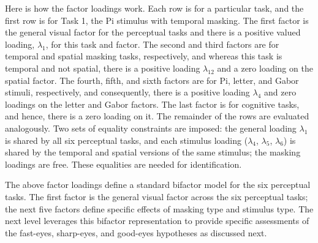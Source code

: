 \documentclass[
  ,man]{apa6}
\begin{document}
Here is how the factor loadings work. Each row is for a particular task, and the first row is for Task 1, the Pi stimulus with temporal masking. The first factor is the general visual factor for the perceptual tasks and there is a positive valued loading, \(\lambda_{1}\), for this task and factor. The second and third factors are for temporal and spatial masking tasks, respectively, and whereas this task is temporal and not spatial, there is a positive loading \(\lambda_{12}\) and a zero loading on the spatial factor. The fourth, fifth, and sixth factors are for Pi, letter, and Gabor stimuli, respectively, and consequently, there is a positive loading \(\lambda_{4}\) and zero loadings on the letter and Gabor factors. The last factor is for cognitive tasks, and hence, there is a zero loading on it. The remainder of the rows are evaluated analogously. Two sets of equality constraints are imposed: the general loading \(\lambda_1\) is shared by all six perceptual tasks, and each stimulus loading (\(\lambda_4\), \(\lambda_5\), \(\lambda_6\)) is shared by the temporal and spatial versions of the same stimulus; the masking loadings are free. These equalities are needed for identification.

The above factor loadings define a standard bifactor model for the six perceptual
tasks. The first factor is the general visual factor across the six perceptual tasks; the next five factors define specific effects of masking type and stimulus type. The next level leverages this bifactor representation to provide specific assessments of the fast-eyes, sharp-eyes, and good-eyes hypotheses as discussed next.
\end{document}
